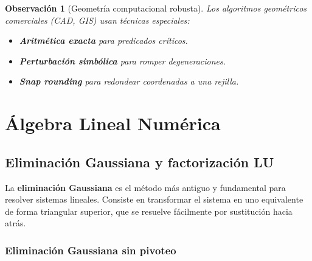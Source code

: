 \documentclass[a4paper,11pt]{report}
\newtheorem{remark}[theorem]{Observación}
\begin{document}
\begin{remark}[Geometría computacional robusta]
Los algoritmos geométricos comerciales (CAD, GIS) usan técnicas especiales:
\begin{itemize}
\item \textbf{Aritmética exacta} para predicados críticos.
\item \textbf{Perturbación simbólica} para romper degeneraciones.
\item \textbf{Snap rounding} para redondear coordenadas a una rejilla.
\end{itemize}
\end{remark}


\chapter{Álgebra Lineal Numérica \label{cap_aln}}

\section{Eliminación Gaussiana y factorización LU}

La \textbf{eliminación Gaussiana} es el método más antiguo y fundamental para resolver sistemas lineales. Consiste en transformar el sistema en uno equivalente de forma triangular superior, que se resuelve fácilmente por sustitución hacia atrás.

\subsection{Eliminación Gaussiana sin pivoteo}
\end{document}
